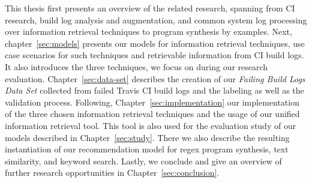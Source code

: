 \documentclass[\myrootdir/main.tex]{subfiles}
\begin{document}
This thesis first presents an overview of the related research, spanning from CI research, build log analysis and augmentation, and common system log processing over information retrieval techniques to program synthesis by examples.
Next, chapter~\ref{sec:models} presents our models for information retrieval techniques, use case scenarios for such techniques and retrievable information from CI build logs. It also introduces the three techniques, we focus on during our research evaluation.
Chapter~\ref{sec:data-set} describes the creation of our \emph{Failing Build Logs Data Set} collected from failed Travis CI build logs and the labeling as well as the validation process.
Following, Chapter~\ref{sec:implementation} our implementation of the three chosen information retrieval techniques and the usage of our unified information retrieval tool.
This tool is also used for the evaluation study of our models described in Chapter~\ref{sec:study}. There we also describe the resulting instantiation of our recommendation model for regex program synthesis, text similarity, and keyword search.
Lastly, we conclude and give an overview of further research opportunities in Chapter~\ref{sec:conclusion}.
\end{document}
